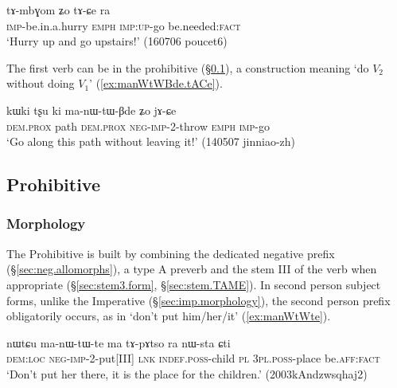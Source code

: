 \begin{exe}
\ex  \label{ex:tAmbGom.tACe}
\gll tɤ-mbɣom ʑo tɤ-ɕe ra\\
\textsc{imp}-be.in.a.hurry \textsc{emph} \textsc{imp}:\textsc{up}-go be.needed:\textsc{fact} \\
\glt `Hurry up and go upstairs!' (160706 poucet6) 
\end{exe}
 
The first verb can be in the prohibitive (§\ref{sec:prohibitive}), a construction meaning `do $V_2$ without doing $V_1$' (\ref{ex:manWtWBde.tACe}).

\begin{exe}
\ex  \label{ex:manWtWBde.tACe}
\gll kɯki tʂu ki ma-nɯ-tɯ-βde ʑo jɤ-ɕe \\
\textsc{dem}.\textsc{prox} path \textsc{dem}.\textsc{prox} \textsc{neg}-\textsc{imp}-2-throw \textsc{emph} \textsc{imp}-go \\
\glt `Go along this path without leaving it!' (140507 jinniao-zh)
\end{exe}

\subsection{Prohibitive} \label{sec:prohibitive}
\subsubsection{Morphology} \label{sec:prohibitive.morpho}
The Prohibitive is built by combining the dedicated negative prefix  (§\ref{sec:neg.allomorphs}), a type A preverb and the stem III of the verb when appropriate (§\ref{sec:stem3.form}, §\ref{sec:stem.TAME}). In second person subject forms, unlike the Imperative (§\ref{sec:imp.morphology}), the second person prefix obligatorily occurs, as in  `don't put him/her/it' (\ref{ex:manWtWte}).

\begin{exe}
\ex  \label{ex:manWtWte}
\gll nɯtɕu ma-nɯ-tɯ-te ma tɤ-pɤtso ra nɯ-sta ɕti \\
\textsc{dem}:\textsc{loc} \textsc{neg}-\textsc{imp}-2-put[III] \textsc{lnk} \textsc{indef}.\textsc{poss}-child \textsc{pl} \textsc{3pl}.\textsc{poss}-place be.\textsc{aff}:\textsc{fact} \\
\glt `Don't put her there, it is the place for the children.' (2003kAndzwsqhaj2)
\end{exe}


